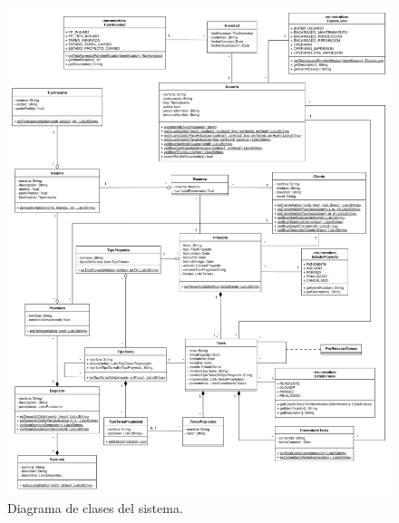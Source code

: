 \documentclass[a4paper, 12pt,twoside]{report}  %
\numberwithin{equation}{subsection} %
\begin{document}


\appendix
\renewcommand{\thefigure}{G.\arabic{figure}}
\setcounter{figure}{0}


\begin{figure}[H]
	\centering
	\includegraphics[scale=0.17]{Diagrama de Clases.png}
	\caption{Diagrama de clases del sistema.}
	\label{diagrama_de_clases}
\end{figure}
\end{document}
